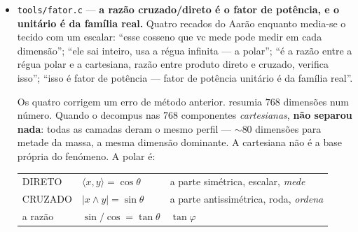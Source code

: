 \documentclass[11pt]{article}
\newcommand{\code}[1]{\texttt{\small #1}}
\theoremstyle{plain}
\theoremstyle{remark}
\begin{document}
\begin{itemize}
\emph{E o que o corpo físico obriga a dizer:} $m = S$, ou seja \textbf{a massa é o cruzado}. Dois
operandos no mesmo campo local não têm inércia, não sofrem força e não pagam imposto --- atravessam
sem custo. É a frase do fator de potência dita em mecânica: quem paga é o cruzado. Nove asserções,
zero falhas.

\emph{E o sinal que faltava, que é uma correção a tudo o acima.} O pedido: ``tem o sinal mesmo da
involução, senão não gira. Isso dá a oscilação entre os duais. No controlo do torque do inversor
também precisa de sinal negativo. A diferença entre duais é apenas um sinal na multiplicação. É a
ação e reação, lei de Lenz, involução --- mesma coisa.'' O que se derivou até §H6 é o lado que
\textbf{foge} ($\ddot s = +2s$, $\cosh$); o dual troca o sinal e é o que \textbf{gira}
($\ddot s = -2s$, $\cos$), com período medido $4{,}442883$ contra $2\pi/\sqrt2 = 4{,}442883$.

E §H7 mede que os três nomes são um só sinal, cada um \emph{com o seu controlo} --- sem o qual
passariam por construção: a 3ª lei conserva o momento total (deriva $0$) e sem ela ele foge
($4{,}2\times10^{-1}$); Lenz amortece ($0{,}27$) e sem o sinal bombeia ($4{,}0$); e
$\nu\circ\nu = \mathrm{id}$ com resíduo exatamente $0$, que é o que torna o dual reversível.
\textbf{Com os dois em alternância o corpo oscila e fica limitado} --- nem foge nem colapsa. Nenhum
dos lados sozinho faz isso: o que fecha o ciclo é o par. Quinze asserções, zero falhas.

\item \code{tools/fator.c} --- \textbf{a razão cruzado/direto é o fator de potência, e o unitário é
da família real.} Quatro recados do Aarão enquanto media-se o tecido com um escalar: ``esse cosseno
que vc mede pode medir em cada dimensão''; ``ele sai inteiro, usa a régua infinita --- a polar'';
``é a razão entre a régua polar e a cartesiana, razão entre produto direto e cruzado, verifica
isso''; ``isso é fator de potência --- fator de potência unitário é da família real''.

Os quatro corrigem um erro de método anterior. resumia $768$ dimensões num número. Quando o decompus
nas $768$ componentes \emph{cartesianas}, \textbf{não separou nada}: todas as camadas deram o mesmo
perfil --- $\sim 80$ dimensões para metade da massa, a mesma dimensão dominante. A cartesiana não é
a base própria do fenómeno. A polar é:

\begin{center}\small
\begin{tabular}{lll}
\hline
DIRETO & $\langle x,y\rangle = \cos\theta$ & a parte simétrica, escalar, \emph{mede} \\
CRUZADO & $|x \wedge y| = \sin\theta$ & a parte antissimétrica, roda, \emph{ordena} \\
a razão & $\sin/\cos = \tan\theta$ & $\tan\varphi$ \\
\hline
\end{tabular}
\end{center}


\end{itemize}
\end{document}

